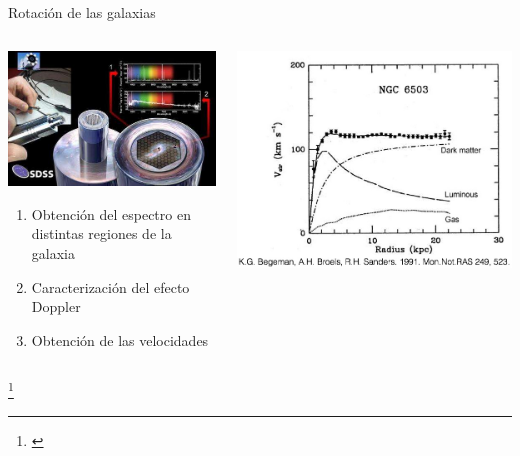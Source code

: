 \documentclass[handout]{beamer}
\newcommand\blfootnote[1]
{%
	\begingroup
	\renewcommand\thefootnote{}\footnote{#1}%
	\addtocounter{footnote}{-1}%
	\endgroup
}
\newcommand{\fcite}[1]{\blfootnote{\cite{#1}}}
\begin{document}
\begin{frame}{Rotación de las galaxias}
	\begin{columns}
		\begin{column}{0.6\textwidth}
			\includegraphics[width = 0.9\linewidth]{sources/images/SDSS.jpg} \\
			\begin{enumerate}
				\item Obtención del espectro en distintas regiones de la galaxia
				\item Caracterización del efecto Doppler
				\item Obtención de las velocidades
			\end{enumerate}
		\end{column}
		\begin{column}{0.4\textwidth}
			\includegraphics[width = \linewidth]{sources/images/rotation.jpg} \\
		\end{column}
	\end{columns}
	
	\fcite{tegmark2006cosmological}
\end{frame}
\end{document}
